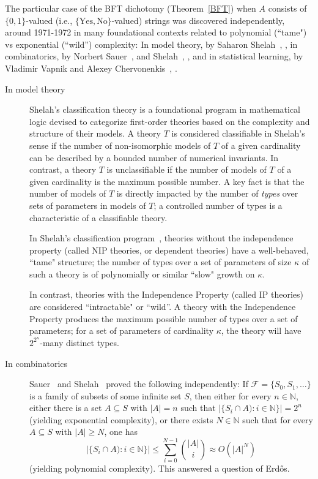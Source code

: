 \documentclass[psamsfonts]{amsart}
\theoremstyle{definition}
\theoremstyle{remark}
\numberwithin{equation}{section}
\begin{document}
The particular case of the BFT dichotomy (Theorem~\ref{BFT}) when $A$ consists of $\{0,1\}$-valued (i.e., $\{\text{Yes},\text{No}\}$-valued) strings was discovered independently, around 1971-1972 in many foundational contexts related to polynomial (``tame") vs exponential (``wild'') complexity:  In model theory, by Saharon Shelah~\cite{Shelah:1971}, \cite{Shelah:1990}, in  combinatorics, by Norbert Sauer~\cite{Sauer:1972}, and Shelah~\cite{Shelah:1972}, \cite{Shelah:1990}, and in statistical learning, by Vladimir Vapnik and Alexey Chervonenkis~\cite{Vapnik-Chervonenkis:1971}, \cite{Vapnik-Chervonenkis:1974}.


\begin{description}

\item[In model theory]
Shelah's classification theory is a foundational program in mathematical logic devised to categorize first-order theories based on the complexity and structure of their models.
A theory $T$ is considered classifiable in Shelah's sense if the number of non-isomorphic models of $T$ of a given cardinality can be described by a bounded number of numerical invariants.
In contrast, a theory $T$ is unclassifiable if the number of models of $T$ of a given cardinality is the maximum possible number.
A key fact is that the  number of models of $T$ is directly impacted by the number of  \emph{types} over  sets of parameters in models of $T$; a controlled number of types is a characteristic of a classifiable theory.


In Shelah's classification program~\cite{Shelah:1990}, theories without the independence property (called NIP theories, or dependent theories) have a well-behaved, ``tame" structure; the number of types over a set of parameters of size $\kappa$ of such a theory is of polynomially or similar ``slow" growth on $\kappa$.

In contrast, theories with the Independence Property  (called IP theories) are considered ``intractable" or ``wild''.
A theory with the Independence Property produces the maximum possible number of types over a set of parameters;  for a set of parameters of cardinality $\kappa$, the theory will have $2^{2^{\kappa}}$-many distinct types.

 \item[In combinatorics]
 Sauer~\cite{Sauer:1972} and Shelah~\cite{Shelah:1972} proved the following independently: If $\mathscr{F}=\{S_0,S_1,\dots\}$ is a family of subsets of some infinite set $S$, then either for every $n\in\mathbb{N}$, either there is  a set $A\subseteq S$ with $|A|=n$ such that $|\{S_i\cap A): i\in\mathbb{N}\}|=2^n$ (yielding exponential complexity),
or there exists $N\in\mathbb{N}$ such that  for every $A\subseteq S$ with $|A|\ge N$, one has
\[
|\{S_i\cap A): i\in\mathbb{N}\}| \le \sum_{i=0}^{N-1} \binom{|A|}{i} \approx O(|A|^N)
\]
(yielding polynomial complexity).
This answered a question of Erd\H{o}s.



\end{description}
\end{document}
